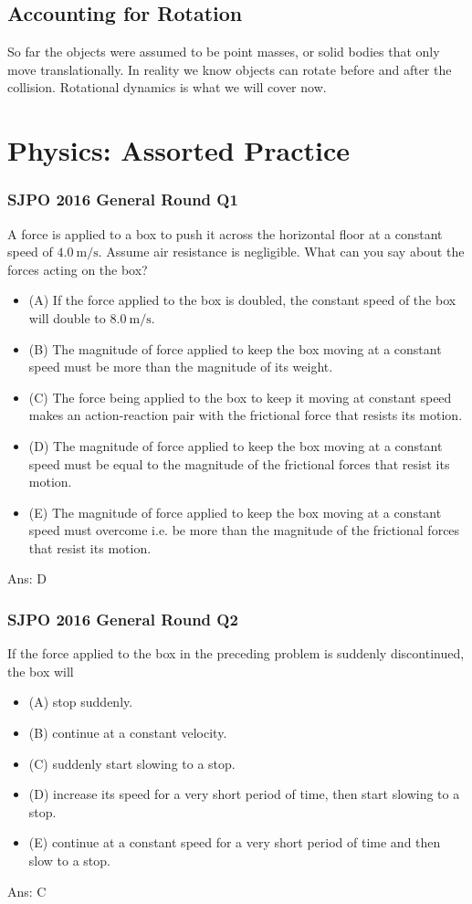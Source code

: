 \documentclass{article}
\begin{document}
\subsection{Accounting for Rotation}
So far the objects were assumed to be point masses, or solid bodies that only move translationally. In reality we know objects can rotate before and after the collision. Rotational dynamics is what we will cover now.
\clearpage
\section{Physics: Assorted Practice}

\subsubsection{SJPO 2016 General Round Q1}
A force is applied to a box to push it across the horizontal floor at a constant speed of $4.0 \mathrm{~m} / \mathrm{s}$. Assume air resistance is negligible. What can you say about the forces acting on the box?
\begin{itemize}
\item[] (A) If the force applied to the box is doubled, the constant speed of the box will double to $8.0 \mathrm{~m} / \mathrm{s}$.
\item[] (B) The magnitude of force applied to keep the box moving at a constant speed must be more than the magnitude of its weight.
\item[] (C) The force being applied to the box to keep it moving at constant speed makes an action-reaction pair with the frictional force that resists its motion.
\item[] (D) The magnitude of force applied to keep the box moving at a constant speed must be equal to the magnitude of the frictional forces that resist its motion.
\item[] (E) The magnitude of force applied to keep the box moving at a constant speed must overcome i.e. be more than the magnitude of the frictional forces that resist its motion.
\end{itemize}
Ans: \ifpaper D \fi

\subsubsection{SJPO 2016 General Round Q2}
If the force applied to the box in the preceding problem is suddenly discontinued, the box will
\begin{itemize}
\item[] (A) stop suddenly.
\item[] (B) continue at a constant velocity.
\item[] (C) suddenly start slowing to a stop.
\item[] (D) increase its speed for a very short period of time, then start slowing to a stop.
\item[] (E) continue at a constant speed for a very short period of time and then slow to a stop.
\end{itemize}
Ans: \ifpaper C \fi
\end{document}
